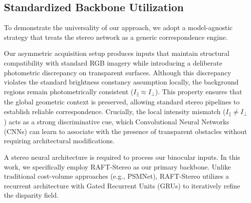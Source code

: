 \documentclass[letterpaper, 10 pt, conference]{ieeeconf}  %
\begin{document}
\subsection{\textbf{Standardized Backbone Utilization}}

To demonstrate the universality of our approach, we adopt a model-agnostic strategy that treats the stereo network as a generic correspondence engine.

Our asymmetric acquisition setup produces inputs that maintain structural compatibility with standard RGB imagery while introducing a deliberate photometric discrepancy on transparent surfaces. Although this discrepancy violates the standard brightness constancy assumption locally, the background regions remain photometrically consistent ($I_{\parallel} \approx I_{\perp}$). This property ensures that the global geometric context is preserved, allowing standard stereo pipelines to establish reliable correspondence. Crucially, the local intensity mismatch ($I_{\parallel} \neq I_{\perp}$) acts as a strong discriminative cue, which Convolutional Neural Networks (CNNs) can learn to associate with the presence of transparent obstacles without requiring architectural modifications.

 A stereo neural architecture is required to process our binocular inputs. In this work, we specifically employ RAFT-Stereo \cite{lipson_raft-stereo_2021} as our primary backbone. Unlike traditional cost-volume approaches (e.g., PSMNet), RAFT-Stereo utilizes a recurrent architecture with Gated Recurrent Units (GRUs) to iteratively refine the disparity field.
\end{document}
